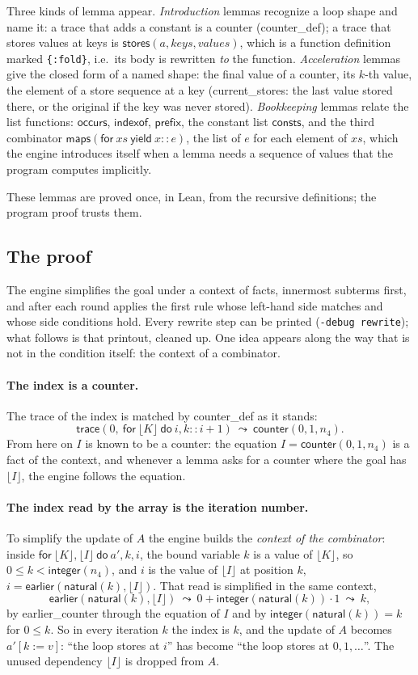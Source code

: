 \documentclass[11pt,a4paper]{article}
\newcommand{\bl}[1]{\lfloor #1\rfloor}                       %
\newcommand{\tr}[3]{\mathsf{trace}(#1,\ \mathsf{for}\ #2\ \mathsf{do}\ #3)}
\newcommand{\mapc}[2]{\mathsf{maps}(\mathsf{for}\ #1\ \mathsf{yield}\ #2)}
\newcommand{\cnt}{\mathsf{counter}}
\newcommand{\ear}{\mathsf{earlier}}
\newcommand{\intf}{\mathsf{integer}}
\newcommand{\natf}{\mathsf{natural}}
\newcommand{\stores}{\mathsf{stores}}
\newcommand{\consts}{\mathsf{consts}}
\newcommand{\occurs}{\mathsf{occurs}}
\newcommand{\indexof}{\mathsf{indexof}}
\newcommand{\prefix}{\mathsf{prefix}}
\newcommand{\lemma}[1]{\textsf{#1}}
\newcommand{\rw}{\ \leadsto\ }
\begin{document}
Three kinds of lemma appear. \emph{Introduction} lemmas recognize a loop shape and name it: a trace that adds a
constant is a counter (\lemma{counter\_def}); a trace that stores values at keys is $\stores(a, keys, values)$,
which is a function definition marked \lstinline|{:fold}|, i.e.\ its body is rewritten \emph{to} the function.
\emph{Acceleration} lemmas give the closed form of a named shape: the final value of a counter, its $k$-th value,
the element of a store sequence at a key (\lemma{current\_stores}: the last value stored there, or the original
if the key was never stored). \emph{Bookkeeping} lemmas relate the list functions: $\occurs$, $\indexof$, $\prefix$,
the constant list $\consts$, and the third combinator $\mapc{xs}{x :: e}$, the list of $e$ for each element of $xs$,
which the engine introduces itself when a lemma needs a sequence of values that the program computes implicitly.

These lemmas are proved once, in Lean, from the recursive definitions; the program proof trusts them.

\subsection{The proof}

The engine simplifies the goal under a context of facts, innermost subterms first, and after each round applies the
first rule whose left-hand side matches and whose side conditions hold. Every rewrite step can be printed
(\texttt{-debug rewrite}); what follows is that printout, cleaned up. One idea appears along the way that is not in
the condition itself: the context of a combinator.

\paragraph{The index is a counter.} The trace of the index is matched by \lemma{counter\_def} as it stands:
\[
\tr{0}{\bl{K}}{i, k :: i + 1} \rw \cnt(0, 1, n_4).
\]
From here on $I$ is known to be a counter: the equation $I = \cnt(0, 1, n_4)$ is a fact of the context, and
whenever a lemma asks for a counter where the goal has $\bl{I}$, the engine follows the equation.

\paragraph{The index read by the array is the iteration number.} To simplify the update of $A$ the engine builds the
\emph{context of the combinator}: inside $\mathsf{for}\ \bl{K}, \bl{I}\ \mathsf{do}\ a', k, i$, the bound variable
$k$ is a value of $\bl{K}$, so $0 \le k < \intf(n_4)$, and $i$ is the value of $\bl{I}$ at position $k$,
$i = \ear(\natf(k), \bl{I})$. That read is simplified in the same context,
\[
\ear(\natf(k), \bl{I}) \rw 0 + \intf(\natf(k)) \cdot 1 \rw k,
\]
by \lemma{earlier\_counter} through the equation of $I$ and by $\intf(\natf(k)) = k$ for $0 \le k$. So in every
iteration $k$ the index is $k$, and the update of $A$ becomes $a'[k := v]$: ``the loop stores at $i$'' has become
``the loop stores at $0, 1, \ldots$''. The unused dependency $\bl{I}$ is dropped from $A$.
\end{document}
